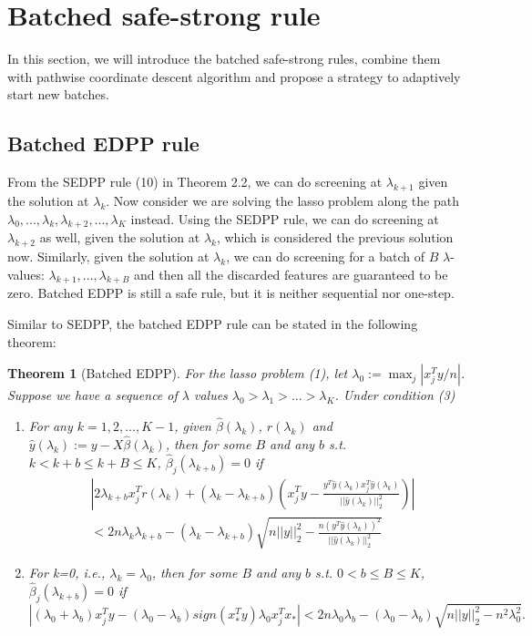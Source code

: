 \documentclass{article}
\newtheorem{theorem}{Theorem}[section]
\begin{document}
\section{Batched safe-strong rule}
\label{sec:method}

In this section, we will introduce the batched safe-strong rules, combine them with pathwise coordinate descent algorithm and propose a strategy to adaptively  start new batches.

\subsection{Batched EDPP rule}

From the SEDPP rule (10) in Theorem 2.2, we can do screening at $\lambda_{k+1}$ given the solution at $\lambda_k$. Now consider we are solving the lasso problem along the path $\lambda_0,...,\lambda_k,\lambda_{k+2},...,\lambda_K$ instead. Using the SEDPP rule, we can do screening at $\lambda_{k+2}$ as well, given the solution at $\lambda_k$, which is considered the previous solution now. Similarly, given the solution at $\lambda_k$, we can do screening for a batch of $B$ $\lambda$-values: $\lambda_{k+1},...,\lambda_{k+B}$ and then all the discarded features are guaranteed to be zero. Batched EDPP is still a safe rule, but it is neither sequential nor one-step.

Similar to SEDPP, the batched EDPP rule can be stated in the following theorem:

\begin{theorem}[Batched EDPP]
    For the lasso problem (1), let $\lambda_0:=\max_j|x_j^Ty/n|$. Suppose we have a sequence of $\lambda$ values $\lambda_0>\lambda_1>...>\lambda_K$. Under condition (3)
    \begin{enumerate}
        \item For any $k=1,2,...,K-1$, given $\hat{\beta}(\lambda_k)$, $r(\lambda_k)$ and $\hat{y}(\lambda_k):=y-X\hat{\beta}(\lambda_k)$, then for some $B$ and any $b$ s.t. $k<k+b\leq k+B\leq K$, $\hat{\beta}_j(\lambda_{k+b})=0$ if
        \begin{equation}
            \begin{split}
                &\left|2\lambda_{k+b}x_j^Tr(\lambda_k)+(\lambda_k-\lambda_{k+b})\left( x_j^Ty-\frac{y^T\hat{y}(\lambda_k)x_j^T\hat{y}(\lambda_k)}{||\hat{y}(\lambda_k)||_2^2}\right)\right|\\&<2n\lambda_k\lambda_{k+b}-(\lambda_k-\lambda_{k+b})\sqrt{n||y||_2^2-\frac{n(y^T\hat{y}(\lambda_k))^2}{||\hat{y}(\lambda_k)||_2^2}}
            \end{split}
        \end{equation}
        \item For k=0, i.e., $\lambda_k=\lambda_0$, then for some $B$ and any $b$ s.t. $0<b\leq B\leq K$, $\hat{\beta}_j(\lambda_{k+b})=0$ if
        \begin{equation}
        |(\lambda_0+\lambda_b)x_j^Ty-(\lambda_0-\lambda_b)sign(x_*^Ty)\lambda_0x_j^Tx_*|<2n\lambda_0\lambda_b-(\lambda_0-\lambda_b)\sqrt{n||y||_2^2-n^2\lambda_0^2}.
    \end{equation}
    \end{enumerate}
\end{theorem}
\end{document}
